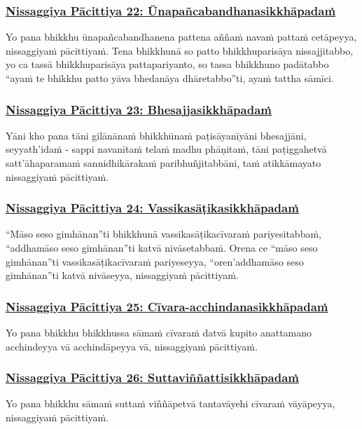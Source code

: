 \subsubsection*{\hyperref[forf-exp22]{Nissaggiya Pācittiya 22: Ūnapañcabandhanasikkhāpadaṁ}}
\label{np22}
Yo pana bhikkhu ūnapañcabandhanena pattena aññaṁ navaṁ pattaṁ cetāpeyya, nissaggiyaṁ pācittiyaṁ. Tena bhikkhunā so patto bhikkhuparisāya nissajjitabbo, yo ca tassā bhikkhuparisāya pattapariyanto, so tassa bhikkhuno padātabbo “ayaṁ te bhikkhu patto yāva bhedanāya dhāretabbo”ti, ayaṁ tattha sāmīci.

\subsubsection*{\hyperref[forf-exp23]{Nissaggiya Pācittiya 23: Bhesajjasikkhāpadaṁ}}
\label{np23}
Yāni kho pana tāni gilānānaṁ bhikkhūnaṁ paṭisāyanīyāni bhesajjāni, seyyath'idaṁ - sappi navanītaṁ telaṁ madhu phāṇitaṁ, tāni paṭiggahetvā satt'āhaparamaṁ sannidhikārakaṁ paribhuñjitabbāni, taṁ atikkāmayato nissaggiyaṁ pācittiyaṁ.

\subsubsection*{\hyperref[forf-exp24]{Nissaggiya Pācittiya 24: Vassikasāṭikasikkhāpadaṁ}}
\label{np24}
“Māso seso gimhānan''ti bhikkhunā vassikasāṭikacīvaraṁ pariyesitabbaṁ, “addhamāso seso gimhānan''ti katvā nivāsetabbaṁ. Orena ce “māso seso gimhānan''ti vassikasāṭikacīvaraṁ pariyeseyya, “oren'addhamāso seso gimhānan''ti katvā nivāseyya, nissaggiyaṁ pācittiyaṁ.

\subsubsection*{\hyperref[forf-exp25]{Nissaggiya Pācittiya 25: Cīvara-acchindanasikkhāpadaṁ}}
\label{np25}
Yo pana bhikkhu bhikkhussa sāmaṁ cīvaraṁ datvā kupito anattamano acchindeyya vā acchindāpeyya vā, nissaggiyaṁ pācittiyaṁ.

\subsubsection*{\hyperref[forf-exp26]{Nissaggiya Pācittiya 26: Suttaviññattisikkhāpadaṁ}}
\label{np26}
Yo pana bhikkhu sāmaṁ suttaṁ viññāpetvā tantavāyehi cīvaraṁ vāyāpeyya, nissaggiyaṁ pācittiyaṁ.

